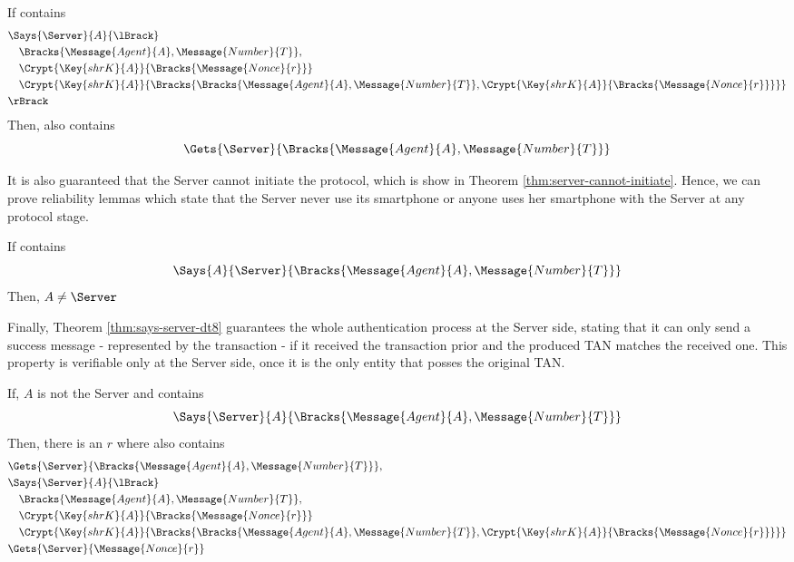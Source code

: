 \begin{theorem}
  \label{thm:says-server-dt2}
  If  contains
  \begin{align*}
    & \Says{\Server}{A}{\lBrack} \\
      & \quad \Bracks{\Message{Agent}{A}, \Message{Number}{T}}, \\
      & \quad \Crypt{\Key{shrK}{A}}{\Bracks{\Message{Nonce}{r}}} \\
      & \quad \Crypt{\Key{shrK}{A}}{\Bracks{\Bracks{\Message{Agent}{A}, \Message{Number}{T}},\Crypt{\Key{shrK}{A}}{\Bracks{\Message{Nonce}{r}}}}} \\
    & \rBrack
  \end{align*}
  Then,  also contains \\
  \[ \Gets{\Server}{\Bracks{\Message{Agent}{A}, \Message{Number}{T}}} \]
\end{theorem}

It is also guaranteed that the Server cannot initiate the protocol, which is show in Theorem \ref{thm:server-cannot-initiate}. Hence, we can prove reliability lemmas which state that the Server never use its smartphone or anyone uses her smartphone with the Server at any protocol stage.

\begin{theorem}
  \label{thm:server-cannot-initiate}
  If  contains \\ 
  \[ \Says{A}{\Server}{\Bracks{\Message{Agent}{A}, \Message{Number}{T}}}\]
  Then, $A \neq \Server$
\end{theorem}

Finally, Theorem \ref{thm:says-server-dt8} guarantees the whole authentication process at the Server side, stating that it can only send a success message - represented by the transaction - if it received the transaction prior and the produced TAN matches the received one. This property is verifiable only at the Server side, once it is the only entity that posses the original TAN.

\begin{theorem}
  \label{thm:says-server-dt8}
  If, $A$ is not the Server and  contains
  \[ \Says{\Server}{A}{\Bracks{\Message{Agent}{A}, \Message{Number}{T}}}\]
  Then, there is an $r$ where  also contains
  \begin{align*}
    & \Gets{\Server}{\Bracks{\Message{Agent}{A}, \Message{Number}{T}}}, \\
    & \Says{\Server}{A}{\lBrack} \\
      & \quad \Bracks{\Message{Agent}{A}, \Message{Number}{T}}, \\
      & \quad \Crypt{\Key{shrK}{A}}{\Bracks{\Message{Nonce}{r}}} \\
      & \quad \Crypt{\Key{shrK}{A}}{\Bracks{\Bracks{\Message{Agent}{A}, \Message{Number}{T}},\Crypt{\Key{shrK}{A}}{\Bracks{\Message{Nonce}{r}}}}} \\
    & \Gets{\Server}{\Message{Nonce}{r}}
  \end{align*}
\end{theorem}



